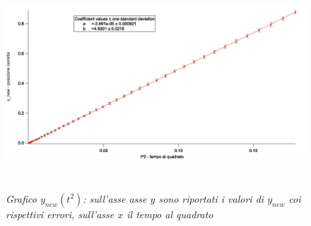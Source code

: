 \documentclass[12pt, a4paper]{article}
\begin{document}
\begin{figure}[h!]
\centering
\includegraphics[width=170mm, height=80mm]{Immagini/Graph5 non comp.jpg}
\caption{\textit{{\footnotesize{Grafico $y_{new}(t^2)$: sull'asse asse $y$ sono riportati i valori di $y_{new}$ coi rispettivi errori, sull'asse $x$ il tempo al quadrato}}}}
\label{Grafico logaritmico}
\end{figure}
\end{document}
